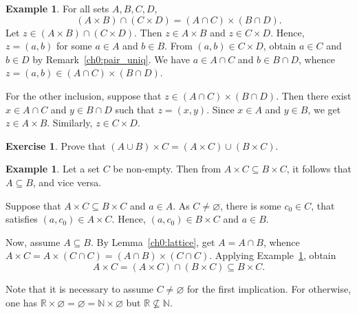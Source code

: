 \documentclass[12pt,notitlepage]{article}
\theoremstyle{plain}
\theoremstyle{definition}
\newtheorem{exc}[thm]{Exercise}
\newtheorem{exm}[thm]{Example}
\theoremstyle{plain}
\newcommand{\N}{\mathbb{N}}
\newcommand{\R}{\mathbb{R}}
\newcommand{\sbs}{\subseteq}
\newcommand{\void}{\varnothing}
\newcommand{\1}{\mathbf{1}}
\newcommand{\0}{\mathbf{0}}
\newcommand{\mcomm}[1]{}
\begin{document}
\begin{exm}\label{ch0:exm32}
For all sets $A, B, C, D$, 
$$(A \times B) \cap (C \times D) = (A \cap C) \times (B \cap D).$$
Let $z \in (A \times B) \cap (C \times D)$. Then $z \in A \times B$ and $z \in C \times D$.  Hence, $z = (a,b)$ for some $a \in A$ and $b\in B$. From $(a,b) \in C \times D$, obtain $a \in C$ and $b \in D$ by Remark~\ref{ch0:pair_uniq}. We have $a \in A \cap C$ and $b \in B \cap D$, whence $z = (a, b) \in (A \cap C) \times (B \cap D)$.

For the other inclusion, suppose that $z \in (A \cap C) \times (B \cap D)$. Then there exist $x \in A \cap C$ and $y \in B \cap D$ such that $z = (x, y)$. Since $x \in A$ and $y \in B$, we get $z \in A \times B$. Similarly, $z \in C \times D$.
\end{exm}
\mcomm{We will allow more laxity (like in saying ``let $(x, y) \in (A \times B) \cap (C \times D)$'') in treating pairs when the students have clearly understood (hopefully) that one owes all such laxity solely to Lemma~\ref{ch0:pair}.}

\begin{exc}
Prove that
$(A \cup B) \times C = (A \times C) \cup (B \times C).$
\end{exc}

\begin{exm}\label{ch0:exm34}
Let a set $C$ be non-empty. Then from $A \times C \sbs B \times C$, it follows that $A \sbs B$, and vice versa.

Suppose that $A \times C \sbs B \times C$ and $a \in A$. As $C \neq \void$, there is some $c_0 \in C$, that satisfies $(a,c_0) \in A \times C$. Hence, $(a,c_0) \in B \times C$ and $a \in B$.

Now, assume $A \sbs B$. By Lemma~\ref{ch0:lattice}, get $A = A \cap B$, whence $A \times C = A \times (C \cap C) = (A \cap B) \times (C \cap C)$. Applying Example~\ref{ch0:exm32}, obtain
$$A \times C = (A \times C) \cap (B \times C) \sbs B \times C.$$
\end{exm}
Note that it is necessary to assume $C \neq \void$ for the first implication. For otherwise, one has $\R \times \void = \void = \N \times \void$ but $\R \not\sbs \N$.

\mcomm{The clear resemblance of this statement to the cancellation laws for numerical multiplication is noteworthy. In this one and many examples that follow, the Instructor should try to persuade the students, that the Cartesian \emph{product} is a ``product'' indeed.}
\end{document}
